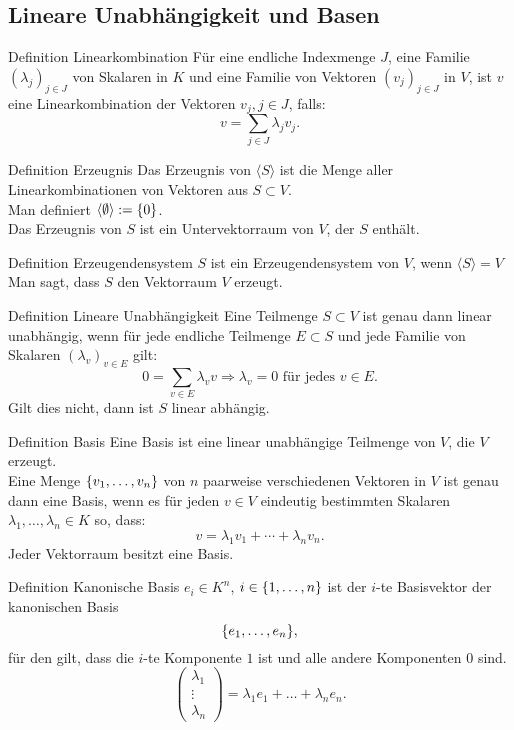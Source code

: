 \documentclass[main.tex]{subfiles}
\begin{document}
\subsection*{Lineare Unabhängigkeit und Basen}
\begin{karte}{Definition Linearkombination}
    Für eine endliche Indexmenge \(J\), eine Familie 
    \( {(\lambda_j)}_{j \in J} \) von Skalaren in 
    \(K\) und eine Familie von Vektoren 
    \( {(v_j)}_{j \in J} \) in \(V\), ist \(v\) eine 
    Linearkombination der Vektoren \(v_j, j \in J\), falls: 
    \[v = \sum_{j \in J} \lambda_j v_j. \]
\end{karte}
\begin{karte}{Definition Erzeugnis}
    Das Erzeugnis von \(\langle S \rangle \) ist die Menge 
    aller Linearkombinationen von Vektoren aus \(S \subset V\). \\
    Man definiert \(\langle \emptyset \rangle : = \{0\}\). \\
    Das Erzeugnis von \(S\) ist ein Untervektorraum von \(V\), 
    der \(S\) enthält.
\end{karte}
\begin{karte}{Definition Erzeugendensystem}
    \(S\) ist ein Erzeugendensystem von \(V\), wenn \(\langle S \rangle = V\)\\
    Man sagt, dass \(S\) den Vektorraum \(V\) erzeugt.
\end{karte}
\begin{karte}{Definition Lineare Unabhängigkeit}
    Eine Teilmenge \(S \subset V\) ist genau dann linear unabhängig,
    wenn für jede endliche Teilmenge \(E \subset S\) 
    und jede Familie von Skalaren \( {(\lambda_v)}_{v \in E}\) gilt: 
    \[ 0 = \sum_{v \in E} \lambda_v v \Rightarrow \lambda_v = 0 
    \text{ für jedes } v \in E. \]
    Gilt dies nicht, dann ist \(S\) linear abhängig.
\end{karte}
\begin{karte}{Definition Basis}
    Eine Basis ist eine linear unabhängige Teilmenge von \(V\), die
    \(V\) erzeugt. \\
    Eine Menge \(\{v_1, \ldots ,v_n\}\) von \(n\) paarweise verschiedenen 
    Vektoren in \(V\) ist genau dann eine Basis, wenn es für jeden \(v \in V\)
    eindeutig bestimmten Skalaren \(\lambda_1, \ldots , \lambda_n \in K\)
    so, dass: 
    \[v = \lambda_1 v_1 + \cdots + \lambda_n v_n.\]
    Jeder Vektorraum besitzt eine Basis. 
\end{karte}
\begin{karte}{Definition Kanonische Basis}
    \(e_i \in K^n\), \(i \in \{1, \ldots, n\}\) ist der 
    \(i\)-te Basisvektor der kanonischen Basis
    \[ \{e_1, \ldots,e_n\}, \] für den gilt, dass die 
    \(i\)-te Komponente \(1\) ist und alle andere 
    Komponenten \(0\) sind.
    \[ \left(
        \begin{array}{c}
        \lambda_1 \\
        \vdots \\
        \lambda_n
        \end{array}
        \right) = \lambda_1 e_1 + \ldots + \lambda_n e_n. \]
\end{karte}
\end{document}
